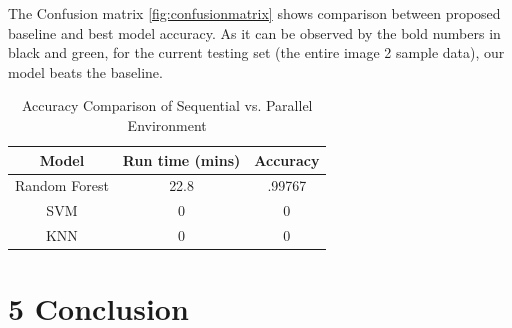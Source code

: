 \documentclass{neu_handout}
\begin{document}
The Confusion matrix \ref{fig:confusionmatrix} shows comparison between proposed baseline and best model accuracy. As it can be observed by the bold numbers in black and green, for the current testing set (the entire image 2 sample data), our model beats the baseline.

\begin{table}[h!]
\centering
 \begin{tabular}{||c c c||} 
 \hline
Model & Run time (mins) & Accuracy \\ [0.5ex] 
 \hline\hline
Random Forest & 22.8  & .99767   \\[1ex] 
 \hline
 SVM & 0  & 0 \\
\hline
KNN & 0  & 0 \\
\hline
 \end{tabular}
 \caption{Accuracy Comparison of Sequential vs. Parallel Environment}
 \label{tab:accuracy-comparison}
\end{table}


\section*{5 Conclusion}


\newpage
\end{document}
